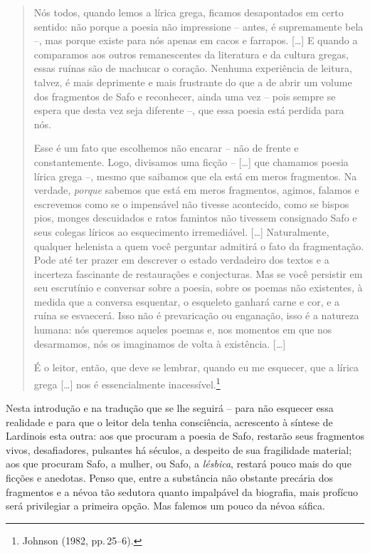 \begin{quote}
Nós todos, quando lemos a lírica grega, ficamos desapontados em certo sentido:
não porque a poesia não impressione -- antes, é supremamente bela --, mas
porque existe para nós apenas em cacos e farrapos. {[}\ldots{}{]} E quando a comparamos
aos outros remanescentes da literatura e da cultura gregas, essas ruínas são de
machucar o coração. Nenhuma experiência de leitura, talvez, é mais deprimente e
mais frustrante do que a de abrir um volume dos fragmentos de Safo e
reconhecer, ainda uma vez -- pois sempre se espera que desta vez seja diferente
--, que essa poesia está perdida para nós.

Esse é um fato que escolhemos não encarar -- não de frente e constantemente.
Logo, divisamos uma ficção -- {[}\ldots{}{]} que chamamos poesia lírica grega --,
mesmo que saibamos que ela está em meros fragmentos. Na verdade,
\textit{porque} sabemos que está em meros fragmentos, agimos, falamos
e escrevemos como se o impensável não tivesse acontecido, como se bispos pios,
monges descuidados e ratos famintos não tivessem consignado Safo e seus colegas
líricos ao esquecimento irremediável. {[}\ldots{}{]} Naturalmente, qualquer helenista a
quem você perguntar admitirá o fato da fragmentação. Pode até ter prazer em
descrever o estado verdadeiro dos textos e a incerteza fascinante de
restaurações e conjecturas. Mas se você persistir em seu escrutínio e conversar
sobre a poesia, sobre os poemas não existentes, à medida que a conversa
esquentar, o esqueleto ganhará carne e cor, e a ruína se esvaecerá. Isso não é
prevaricação ou enganação, isso é a natureza humana: nós queremos aqueles
poemas e, nos momentos em que nos desarmamos, nós os imaginamos de volta à
existência. {[}\ldots{}{]}

É o leitor, então, que deve se lembrar, quando eu me esquecer, que a lírica
grega {[}\ldots{}{]} nos é essencialmente inacessível.\footnote{ Johnson (1982, pp.\,25--6).}
\end{quote}

Nesta introdução e na tradução que se lhe seguirá --
para não esquecer essa realidade e para que o leitor dela tenha consciência,
acrescento à síntese de Lardinois esta outra: aos que procuram a poesia de
Safo, restarão seus fragmentos vivos, desafiadores, pulsantes há séculos, a
despeito de sua fragilidade material; aos que procuram Safo, a mulher, ou Safo,
a \textit{lésbica}, restará pouco mais do que ficções e anedotas. Penso que,
entre a substância não obstante precária dos fragmentos e a névoa tão sedutora
quanto impalpável da biografia, mais profícuo será privilegiar a primeira
opção. Mas falemos um pouco da névoa sáfica.



